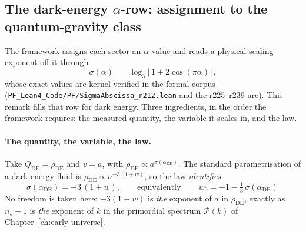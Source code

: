 \subsection{The dark-energy \texorpdfstring{$\alpha$}{alpha}-row: assignment to
the quantum-gravity class}
\label{subsec:de-alpha-row}

\begin{remark}
\label{rem:de-alpha-row}
The framework assigns each sector an $\alpha$-value and reads a physical scaling
exponent off it through
\begin{equation}
\sigma(\alpha) \;=\; \log_3\bigl|\,1 + 2\cos(\pi\alpha)\,\bigr|,
\label{eq:sigma-abscissa}
\end{equation}
whose exact values are kernel-verified in the formal corpus
(\texttt{PF\_Lean4\_Code/PF/SigmaAbscissa\_r212.lean} and the r225--r239 arc).
This remark fills that row for dark energy. Three ingredients, in the order the
framework requires: the measured quantity, the variable it scales in, and the
law.

\paragraph{The quantity, the variable, the law.}
Take $Q_{\text{DE}} = \rho_{\text{DE}}$ and $v = a$, with
$\rho_{\text{DE}} \propto a^{\sigma(\alpha_{\text{DE}})}$. The standard
parametrisation of a dark-energy fluid is
$\rho_{\text{DE}} \propto a^{-3(1+w)}$, so the law \emph{identifies}
\begin{equation}
\sigma(\alpha_{\text{DE}}) = -3\,(1+w),
\qquad\text{equivalently}\qquad
\boxed{\,w_0 = -1 - \tfrac{1}{3}\,\sigma(\alpha_{\text{DE}})\,}
\label{eq:w0-of-sigma}
\end{equation}
No freedom is taken here: $-3(1+w)$ is \emph{the} exponent of $a$ in
$\rho_{\text{DE}}$, exactly as $n_s - 1$ is \emph{the} exponent of $k$ in the
primordial spectrum $\mathcal{P}(k)$ of Chapter~\ref{ch:early-universe}.


\end{remark}
